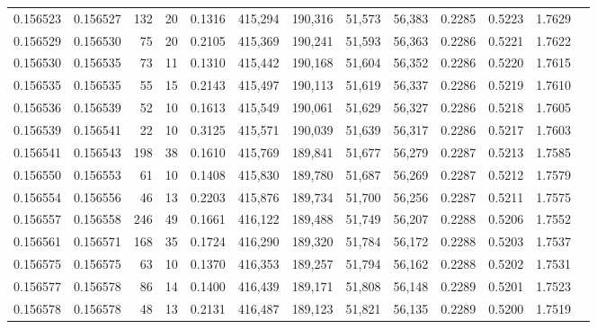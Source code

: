 \begin{tabular}{rrrrrrrrrrrrr}
0.156523 & 0.156527 &   132 &  20 &                                     0.1316 & 415,294 & 190,316 &  51,573 &  56,383 & 0.2285 & 0.5223 & 1.7629 \\
0.156529 & 0.156530 &    75 &  20 &                                     0.2105 & 415,369 & 190,241 &  51,593 &  56,363 & 0.2286 & 0.5221 & 1.7622 \\
0.156530 & 0.156535 &    73 &  11 &                                     0.1310 & 415,442 & 190,168 &  51,604 &  56,352 & 0.2286 & 0.5220 & 1.7615 \\
0.156535 & 0.156535 &    55 &  15 &                                     0.2143 & 415,497 & 190,113 &  51,619 &  56,337 & 0.2286 & 0.5219 & 1.7610 \\
0.156536 & 0.156539 &    52 &  10 &                                     0.1613 & 415,549 & 190,061 &  51,629 &  56,327 & 0.2286 & 0.5218 & 1.7605 \\
0.156539 & 0.156541 &    22 &  10 &                                     0.3125 & 415,571 & 190,039 &  51,639 &  56,317 & 0.2286 & 0.5217 & 1.7603 \\
0.156541 & 0.156543 &   198 &  38 &                                     0.1610 & 415,769 & 189,841 &  51,677 &  56,279 & 0.2287 & 0.5213 & 1.7585 \\
0.156550 & 0.156553 &    61 &  10 &                                     0.1408 & 415,830 & 189,780 &  51,687 &  56,269 & 0.2287 & 0.5212 & 1.7579 \\
0.156554 & 0.156556 &    46 &  13 &                                     0.2203 & 415,876 & 189,734 &  51,700 &  56,256 & 0.2287 & 0.5211 & 1.7575 \\
0.156557 & 0.156558 &   246 &  49 &                                     0.1661 & 416,122 & 189,488 &  51,749 &  56,207 & 0.2288 & 0.5206 & 1.7552 \\
0.156561 & 0.156571 &   168 &  35 &                                     0.1724 & 416,290 & 189,320 &  51,784 &  56,172 & 0.2288 & 0.5203 & 1.7537 \\
0.156575 & 0.156575 &    63 &  10 &                                     0.1370 & 416,353 & 189,257 &  51,794 &  56,162 & 0.2288 & 0.5202 & 1.7531 \\
0.156577 & 0.156578 &    86 &  14 &                                     0.1400 & 416,439 & 189,171 &  51,808 &  56,148 & 0.2289 & 0.5201 & 1.7523 \\
0.156578 & 0.156578 &    48 &  13 &                                     0.2131 & 416,487 & 189,123 &  51,821 &  56,135 & 0.2289 & 0.5200 & 1.7519 \\

\end{tabular}
